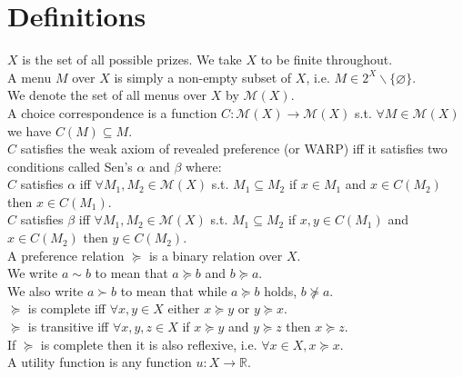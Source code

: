 \documentclass[11pt]{article}
\title{}
\date{}
\theoremstyle{definition}
\theoremstyle{plain}
\begin{document}
\section{Definitions}

$X$ is the set of all possible prizes. We take $X$ to be finite throughout.
\\
A menu $M$ over $X$ is simply a non-empty subset of $X$, i.e. $M \in 2^{X} \backslash \{\varnothing\}$.
\\
We denote the set of all menus over $X$ by $\mathcal{M}(X)$.
\\ 
A choice correspondence is a function $C: \mathcal{M}(X) \to \mathcal{M}(X)$ s.t. $\forall M \in \mathcal{M}(X)$ we have $C(M) \subseteq M$.
\\
$C$ satisfies the weak axiom of revealed preference (or WARP) iff it satisfies two conditions called Sen's $\alpha$ and $\beta$ where:
\\
$C$ satisfies $\alpha$ iff $\forall M_1,M_2 \in \mathcal{M}(X)$ s.t. $M_1 \subseteq M_2$ if $x \in M_1$ and $x \in C(M_2)$ then $x \in C(M_1)$.
\\
$C$ satisfies $\beta$ iff $\forall M_1,M_2 \in \mathcal{M}(X)$ s.t. $M_1 \subseteq M_2$ if $x,y \in C(M_1)$ and $x \in C(M_2)$ then $y \in C(M_2)$.
\\
A preference relation $\succeq$ is a binary relation over $X$.
\\
We write $a \sim b$ to mean that $a \succeq b$ and $b \succeq a$. 
\\
We also write $a \succ b$ to mean that while $a \succeq b$ holds, $b \not \succeq a$.
\\
$\succeq$ is complete iff $\forall x,y \in X$ either $x \succeq y$ or $y \succeq x$. 
\\
$\succeq$ is transitive iff $\forall x,y,z \in X$ if $x \succeq y$ and  $y \succeq z$ then $x \succeq z$.
\\
If $\succeq$ is complete then it is also reflexive, i.e. $\forall x \in X, x \succeq x$.
\\
A utility function is any function $u: X \to \mathbb{R}$.
\end{document}
